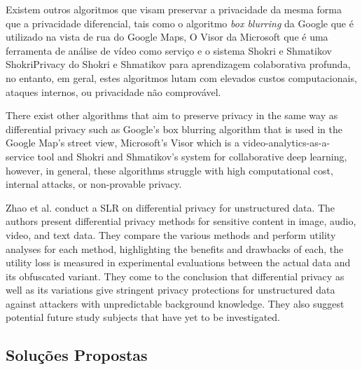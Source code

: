 \documentclass[conference]{IEEEtran}
\begin{document}

Existem outros algoritmos que visam preservar a privacidade da mesma forma
que a privacidade diferencial, tais como o algoritmo \textit{box blurring} da
Google \cite{FromeLarge} que é utilizado na vista de rua do Google Maps, O Visor \cite{poddar2020visor} da Microsoft que é uma ferramenta de análise de vídeo como serviço e o sistema Shokri e Shmatikov {ShokriPrivacy} do Shokri e Shmatikov para aprendizagem colaborativa profunda, no entanto, em geral, estes algoritmos lutam com elevados custos computacionais, ataques internos, ou privacidade não comprovável.

There exist other algorithms that aim to preserve privacy in the same way
as differential privacy such as Google's box blurring algorithm \cite{FromeLarge}
that is used in the Google Map's street view, Microsoft's Visor \cite{poddar2020visor}
which is a video-analytics-as-a-service tool and Shokri and Shmatikov's
\cite{ShokriPrivacy} system for collaborative deep learning, however, in
general, these algorithms struggle with high computational cost, internal
attacks, or non-provable privacy.

Zhao et al. \cite{ZhaoSurvey} conduct a SLR on differential privacy for
unstructured data. The authors present differential privacy methods for
sensitive content in image, audio, video, and text data. They compare the
various methods and perform utility analyses for each method, highlighting
the benefits and drawbacks of each, the utility loss is measured in experimental
evaluations between the actual data and its obfuscated variant. They come
to the conclusion that differential privacy as well as its variations give
stringent privacy protections for unstructured data against attackers with
unpredictable background knowledge. They also suggest potential future study
subjects that have yet to be investigated.

\subsection{Soluções Propostas}
\end{document}
